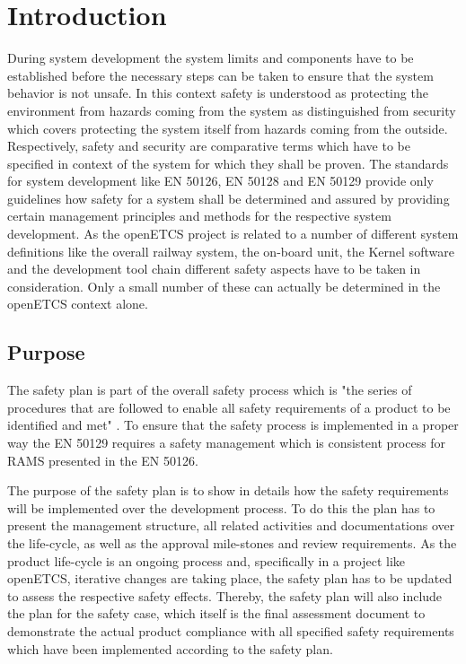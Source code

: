 \documentclass{template/openetcs_report}
\begin{document}

\mainmatter

\chapter{Introduction}
\label{sec:introduction}

During system development the system limits and components have to be established before the necessary steps can be taken to ensure that the system behavior is not unsafe. In this context safety is understood as protecting the environment from hazards coming from the system as distinguished from security which covers protecting the system itself from hazards coming from the outside. Respectively, safety and security are comparative terms which have to be specified in context of the system for which they shall be proven. The standards for system development like EN 50126, EN 50128 and EN 50129 provide only guidelines how safety for a system shall be determined and assured by providing certain management principles and methods for the respective system development. As the openETCS project is related to a number of different system definitions like the overall railway system, the on-board unit, the Kernel software and the development tool chain different safety aspects have to be taken in consideration. Only a small number of these can actually be determined in the openETCS context alone.

\section{Purpose}
\label{sec:purpose}

The safety plan is part of the overall safety process which is "the series of procedures that are followed to enable all safety requirements of a product to be identified and met" \cite{EN50129}. To ensure that the safety process is implemented in a proper way the EN 50129 requires a safety management which is consistent process for RAMS presented in the EN 50126. 

The purpose of the safety plan is to show in details how the safety requirements will be implemented over the development process. To do this the plan has to present the management structure, all related activities and documentations over the life-cycle, as well as the approval mile-stones and review requirements. As the product life-cycle is an ongoing process and, specifically in a project like openETCS, iterative changes are taking place, the safety plan has to be updated to assess the respective safety effects. Thereby, the safety plan will also include the plan for the safety case, which itself is the final assessment document to demonstrate the actual product compliance with all specified safety requirements which have been implemented according to the safety plan.
\end{document}
